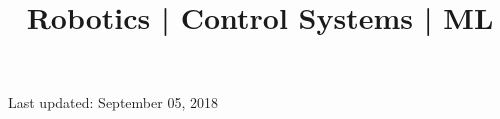 \documentclass[10pt,a4paper]{moderncv}
\title{Robotics | Control Systems  | ML \newline
\bf{\lb{\footnotesize
Rerum Cognoscere Causas: To know the causes of things.} }}
\begin{document}
	\makecvtitle
	
	
	
	
	
	
	
	
	
	
	
	
	
%
	\vspace{0.4in}
	\footnotesize \centering Last updated: September 05, 2018
\renewcommand{\listitemsymbol}{-}
\clearpage
\end{document}
